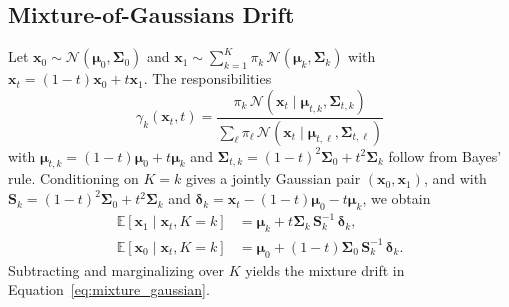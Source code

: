 \subsection{Mixture-of-Gaussians Drift}
Let $\mathbf{x}_0 \sim \mathcal N(\boldsymbol\mu_0,\boldsymbol\Sigma_0)$ and $\mathbf{x}_1 \sim \sum_{k=1}^K \pi_k\,\mathcal N(\boldsymbol\mu_k,\boldsymbol\Sigma_k)$ with $\mathbf{x}_t=(1-t)\mathbf{x}_0+t\mathbf{x}_1$. The responsibilities
\begin{equation*}
\gamma_k(\mathbf x_t,t)=\frac{\pi_k\,\mathcal N(\mathbf x_t\mid \boldsymbol\mu_{t,k},\boldsymbol\Sigma_{t,k})}{\sum_{\ell}\pi_\ell\,\mathcal N(\mathbf x_t\mid \boldsymbol\mu_{t,\ell},\boldsymbol\Sigma_{t,\ell})}
\end{equation*}
with $\boldsymbol\mu_{t,k}=(1-t)\boldsymbol\mu_0+t\boldsymbol\mu_k$ and $\boldsymbol\Sigma_{t,k}=(1-t)^2\boldsymbol\Sigma_0+t^2\boldsymbol\Sigma_k$ follow from Bayes' rule. Conditioning on $K=k$ gives a jointly Gaussian pair $(\mathbf x_0,\mathbf x_1)$, and with $\mathbf S_k=(1-t)^2\boldsymbol\Sigma_0+t^2\boldsymbol\Sigma_k$ and $\boldsymbol\delta_k=\mathbf x_t-(1-t)\boldsymbol\mu_0-t\boldsymbol\mu_k$, we obtain
\begin{align*}
\mathbb{E}[\mathbf{x}_1 \mid \mathbf{x}_t, K=k] &= \boldsymbol\mu_k + t\boldsymbol\Sigma_k\,\mathbf S_k^{-1}\,\boldsymbol\delta_k, \\
\mathbb{E}[\mathbf{x}_0 \mid \mathbf{x}_t, K=k] &= \boldsymbol\mu_0 + (1-t)\boldsymbol\Sigma_0\,\mathbf S_k^{-1}\,\boldsymbol\delta_k.
\end{align*}
Subtracting and marginalizing over $K$ yields the mixture drift in Equation~\eqref{eq:mixture_gaussian}.
